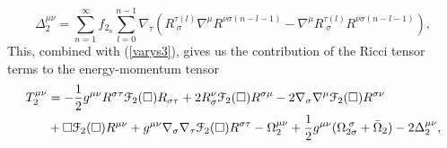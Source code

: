 \begin{equation}
\Delta_{2}^{\mu\nu}=\sum_{n=1}^{\infty}f_{2_{n}}\sum_{l=0}^{n-1}\nabla_{\tau}\left(R_{\;\sigma}^{\tau(l)}\nabla^{\mu}R^{\nu\sigma(n-l-1)}-\nabla^{\mu}R_{\;\sigma}^{\tau(l)}R^{\nu\sigma(n-l-1)}\right),
\end{equation}
This, combined with (\ref{varys3}), gives us the contribution of the Ricci tensor terms to the energy-momentum tensor
\begin{align}
T_{2}^{\mu\nu}	&=	-\frac{1}{2}g^{\mu\nu}R^{\sigma\tau}{\cal F}_{2}(\Box)R_{\sigma\tau}+2R_{\sigma}^{\nu}{\cal F}_{2}(\Box)R^{\sigma\mu}-2\nabla_{\sigma}\nabla^{\mu}{\cal F}_{2}(\Box)R^{\sigma\nu}
		\nonumber\\&+\square{\cal F}_{2}(\Box)R^{\mu\nu}+g^{\mu\nu}\nabla_{\sigma}\nabla_{\tau}{\cal F}_{2}(\Box)R^{\sigma\tau}-\Omega_{2}^{\mu\nu}+\frac{1}{2}g^{\mu\nu}(\Omega_{2\sigma}^{\;\sigma}+\bar{\Omega}_{2})-2\Delta_{2}^{\mu\nu},
 \label{P2}
\end{align}
